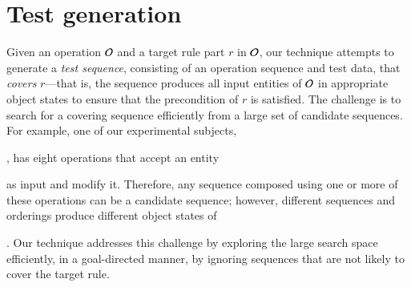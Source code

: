 \section{Test generation}
\label{sec:approach}

Given an operation ${\cal O}$ and a target rule part $r$ in ${\cal O}$, our
technique attempts to generate a \textit{test sequence}, consisting of an
operation sequence and test data, that \textit{covers} $r$---that is, the
sequence produces all input entities of ${\cal O}$ in appropriate object states
to ensure that the precondition of $r$ is satisfied. The challenge is to search
for a covering sequence efficiently from a large set of candidate sequences. For
example, one of our experimental subjects, \subject{Cebu-pacific}, has eight
operations that accept an entity \subject{Ticket} as input and modify
it. Therefore, any sequence composed using one or more of these operations can
be a candidate sequence; however, different sequences and orderings produce
different object states of \subject{Ticket}. Our technique addresses this
challenge by exploring the large search space efficiently, in a goal-directed
manner, by ignoring sequences that are not likely to cover the target rule.



